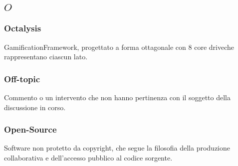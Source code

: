 \subsection*{\quad$O\quad$}
\subsubsection*{Octalysis}
Gamification\glosp Framework\glo, progettato a forma ottagonale con 8 core drive\glosp che rappresentano ciascun lato.

\subsubsection*{Off-topic}
Commento o un intervento che non hanno pertinenza con il soggetto della discussione in corso.

\subsubsection*{Open-Source}
Software non protetto da copyright, che segue la filosofia della produzione collaborativa e dell'accesso pubblico al codice sorgente.

